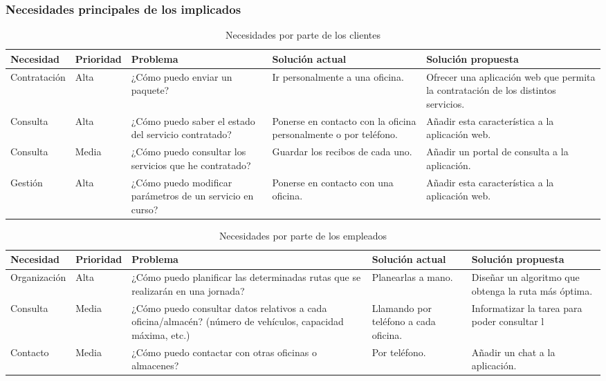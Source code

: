 \documentclass[12pt,spanish]{article}
\begin{document}
\subsubsection{Necesidades principales de los implicados}
\begin{table}[H]
	\begin{center}
	\begin{tabular}{|l|l|m{4.5cm}|m{2cm}|m{2.5cm}|}
			\hline
			\textbf{Necesidad} & \textbf{Prioridad} & \textbf{Problema} & \textbf{Solución actual} & \textbf{Solución propuesta }\\
			\hline
			Contratación & Alta & ¿Cómo puedo enviar un paquete? & Ir personalmente a una oficina. & Ofrecer una aplicación web que permita la contratación de los distintos servicios. \\
			\hline
			Consulta & Alta & ¿Cómo puedo saber el estado del servicio contratado? & Ponerse en contacto con la oficina personalmente o por teléfono. & Añadir esta característica a la aplicación web. \\
			\hline
			Consulta & Media & ¿Cómo puedo consultar los servicios que he contratado? & Guardar los recibos de cada uno. & Añadir un portal de consulta a la aplicación. \\
			\hline
			Gestión & Alta & ¿Cómo puedo modificar parámetros de un servicio en curso? & Ponerse en contacto con una oficina. & Añadir esta característica a la aplicación web. \\
			\hline
	\end{tabular}
	\caption{Necesidades por parte de los clientes}
\end{center}
\end{table}

\begin{table}[H]
\begin{center}
\begin{tabular}{|l|l|m{4.5cm}|m{2cm}|m{2.5cm}|}
\hline
\textbf{Necesidad} & \textbf{Prioridad} & \textbf{Problema} & \textbf{Solución actual} & \textbf{Solución propuesta }\\
\hline
Organización & Alta & ¿Cómo puedo planificar las determinadas rutas que se realizarán en una jornada? & Planearlas a mano. & Diseñar un algoritmo que obtenga la ruta más óptima. \\
\hline
Consulta & Media & ¿Cómo puedo consultar datos relativos a cada oficina/almacén? (número de vehículos, capacidad máxima, etc.) & Llamando por teléfono a cada oficina. & Informatizar la tarea para poder consultar l \\
\hline
Contacto & Media & ¿Cómo puedo contactar con otras oficinas o almacenes? & Por teléfono. & Añadir un chat a la aplicación. \\
\hline
\end{tabular}
\caption{Necesidades por parte de los empleados}
\end{center}
\end{table}
\end{document}
